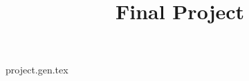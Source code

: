 \documentclass{scrartcl}
\title{Final Project}
\date{\ProjectDate}
\begin{document}
\maketitle

{project.gen.tex}
\end{document}
